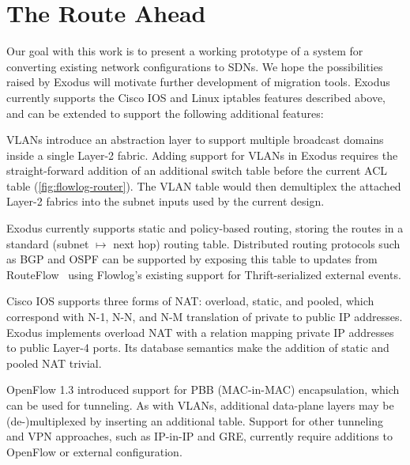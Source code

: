 %

\section{The Route Ahead}  %
\label{sec:road-ahead}

Our goal with this work is to present a working prototype of a system for converting
existing network configurations to SDNs. We hope the possibilities raised by Exodus
will motivate further development of migration tools. Exodus currently supports
the Cisco IOS and Linux iptables features described above, and can be extended to
support the following additional features:

VLANs introduce an abstraction layer to support multiple broadcast domains inside
a single Layer-2 fabric. Adding support for VLANs in Exodus requires the straight-forward
addition of an additional switch table before the current ACL table (\autoref{fig:flowlog-router}). The VLAN table
would then demultiplex the attached Layer-2 fabrics into the subnet inputs used by
the current design.

Exodus currently supports static and policy-based routing, storing the routes in a
standard (subnet $\mapsto$ next hop) routing table. Distributed routing protocols such as
BGP and OSPF can be supported by exposing this table to updates from RouteFlow~\cite{Rothenberg:2012routeflow}
using Flowlog's existing support for Thrift-serialized external events. 

Cisco IOS supports three forms of NAT: overload, static, and pooled,
which correspond with N-1, N-N, and N-M translation of private to public IP addresses. 
Exodus implements overload NAT with a relation mapping private IP addresses
to public Layer-4 ports. Its database semantics make the addition of static and pooled
NAT trivial.

OpenFlow 1.3 introduced support for PBB (MAC-in-MAC) encapsulation, which can
be used for tunneling. As with VLANs, additional data-plane layers may be (de-)multiplexed
by inserting an additional table. Support for other tunneling and VPN approaches,
such as IP-in-IP and GRE, currently require additions to OpenFlow or external configuration.


